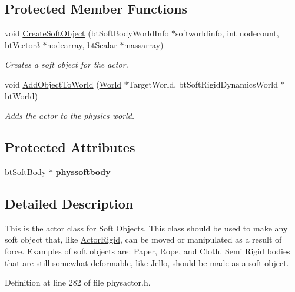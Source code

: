 \subsection*{Protected Member Functions}
\begin{DoxyCompactItemize}
\item 
void \hyperlink{classphys_1_1ActorSoft_a04c98bb0ab9ed7c1dfc3435d49403ef4}{CreateSoftObject} (btSoftBodyWorldInfo $\ast$softworldinfo, int nodecount, btVector3 $\ast$nodearray, btScalar $\ast$massarray)
\begin{DoxyCompactList}\small\item\em Creates a soft object for the actor. \item\end{DoxyCompactList}\item 
void \hyperlink{classphys_1_1ActorSoft_a3a704ab32f847a5d0e060f8a592efefd}{AddObjectToWorld} (\hyperlink{classphys_1_1World}{World} $\ast$TargetWorld, btSoftRigidDynamicsWorld $\ast$btWorld)
\begin{DoxyCompactList}\small\item\em Adds the actor to the physics world. \item\end{DoxyCompactList}\end{DoxyCompactItemize}
\subsection*{Protected Attributes}
\begin{DoxyCompactItemize}
\item 
\hypertarget{classphys_1_1ActorSoft_ab3b2c8e1f94dff3e3244a5024595afef}{
btSoftBody $\ast$ {\bfseries physsoftbody}}
\label{d4/d23/classphys_1_1ActorSoft_ab3b2c8e1f94dff3e3244a5024595afef}

\end{DoxyCompactItemize}


\subsection{Detailed Description}
This is the actor class for Soft Objects. This class should be used to make any soft object that, like \hyperlink{classphys_1_1ActorRigid}{ActorRigid}, can be moved or manipulated as a result of force. Examples of soft objects are: Paper, Rope, and Cloth. Semi Rigid bodies that are still somewhat deformable, like Jello, should be made as a soft object. 

Definition at line 282 of file physactor.h.



